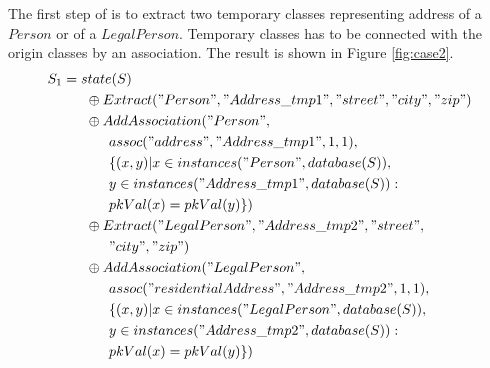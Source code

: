\documentclass[11pt]{article}
\begin{document}
The first  step of is to extract two temporary classes representing address of a $Person$ or of a $LegalPerson$. Temporary classes has to be connected with the origin classes by an association. The result is shown in Figure \ref{fig:case2}.
\begin{align*}
S_1 & = state(S) \\
& \;\;\;\;\;\; \oplus Extract("Person", "Address\_tmp1", "street", "city", "zip") \\
& \;\;\;\;\;\; \oplus AddAssociation("Person", \\ 
& \;\;\;\;\;\;\;\;\;\;\;\; assoc("address", "Address\_tmp1", 1, 1),\\ 
& \;\;\;\;\;\;\;\;\;\;\;\; \{(x,y)| x \in instances("Person", database(S)), \\
& \;\;\;\;\;\; \;\;\;\;\;\; y \in instances("Address\_tmp1", database(S)) : \\ 
& \;\;\;\;\;\;\;\;\;\;\;\; pkVal(x) = pkVal(y) \}) \\
&\;\;\;\;\;\; \oplus Extract("LegalPerson", "Address\_tmp2", "street", \\
& \;\;\;\;\;\;\;\;\;\;\;\; "city", "zip")  \\
& \;\;\;\;\;\; \oplus AddAssociation("LegalPerson", \\ 
& \;\;\;\;\;\;\;\;\;\;\;\; assoc("residentialAddress", "Address\_tmp2", 1, 1),\\ 
& \;\;\;\;\;\;\;\;\;\;\;\; \{(x,y)| x \in instances("LegalPerson", database(S)), \\
& \;\;\;\;\;\;\;\;\;\;\;\; y \in instances("Address\_tmp2", database(S)) : \\
& \;\;\;\;\;\;\;\;\;\;\;\; pkVal(x) = pkVal(y) \}) \\
\end{align*}
\end{document}
